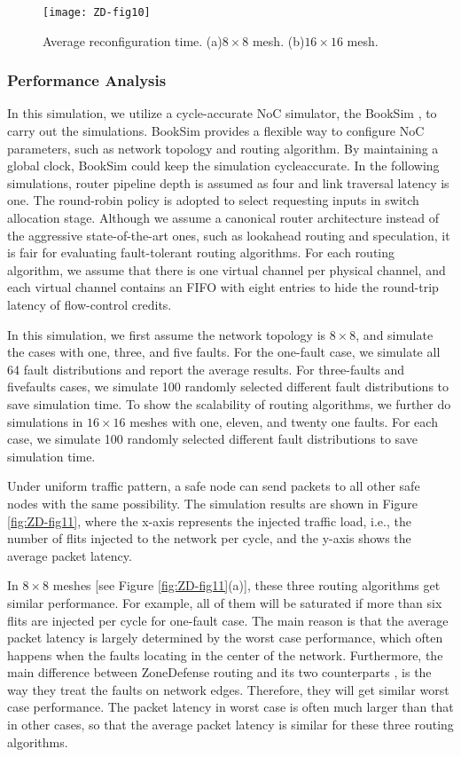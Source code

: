 \begin{figure}[h]
    \centering
        \texttt{[image: ZD-fig10]}
          \caption{Average reconfiguration time. (a)$8 \times 8$ mesh. (b)$16 \times 16$ mesh.}
        \label{fig:ZD-fig10}
\end{figure}

\subsubsection{Performance Analysis}
In this simulation, we utilize a cycle-accurate NoC simulator, the BookSim \cite{dally2004principles}, to carry out the simulations. BookSim provides a flexible way to configure NoC parameters, such as network topology and routing algorithm. By maintaining a global clock, BookSim could keep the simulation cycleaccurate. In the following simulations, router pipeline depth is assumed as four and link traversal latency is one. The round-robin policy is adopted to select requesting inputs in switch allocation stage. Although we assume a canonical router architecture instead of the aggressive state-of-the-art ones, such as lookahead routing and speculation, it is fair for evaluating fault-tolerant routing algorithms. For each routing algorithm, we assume that there is one virtual channel per physical channel, and each virtual channel contains an FIFO with eight entries to hide the round-trip latency of flow-control credits.

In this simulation, we first assume the network topology is $8 \times 8$, and simulate the cases with one, three, and five faults. For the one-fault case, we simulate all 64 fault distributions and report the average results. For three-faults and fivefaults cases, we simulate 100 randomly selected different fault distributions to save simulation time. To show the scalability of routing algorithms, we further do simulations in $16 \times 16$ meshes with one, eleven, and twenty one faults. For each case, we simulate 100 randomly selected different fault distributions to save simulation time.

Under uniform traffic pattern, a safe node can send packets to all other safe nodes with the same possibility. The simulation results are shown in Figure \ref{fig:ZD-fig11}, where the x-axis represents the injected traffic load, i.e., the number of flits injected to the network per cycle, and the y-axis shows the average packet latency.

In $8 \times 8$ meshes [see Figure \ref{fig:ZD-fig11}(a)], these three routing algorithms get similar performance. For example, all of them will be saturated if more than six flits are injected per cycle for one-fault case. The main reason is that the average packet latency is largely determined by the worst case performance, which often happens when the faults locating in the center of the network. Furthermore, the main difference between ZoneDefense routing and its two counterparts \cite{wu2003fault}, \cite{zhang2008reconfigurable} is the way they treat the faults on network edges. Therefore, they will get similar worst case performance. The packet latency in worst case is often much larger than that in other cases, so that the average packet latency is similar for these three routing algorithms.

